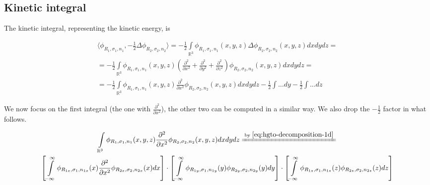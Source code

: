\documentclass{article}
\newcommand{\equalby}[1]{\xlongequal{\text{by }\eqref{#1}}}
\begin{document}
\begin{appendices}
\subsection{Kinetic integral}

The kinetic integral, representing the kinetic energy, is

\begin{equation} \label{eq:hgto-kinetic-1}
\begin{gathered}
\langle \phi_{R_1,\sigma_1,n_1}, -\frac{1}{2}\Delta\phi_{R_2,\sigma_2,n_2} \rangle = -\frac{1}{2} \int\limits_{\mathbb{R}^3} \phi_{R_1,\sigma_1,n_1}(x,y,z) \Delta\phi_{R_2,\sigma_2,n_2}(x,y,z) dxdydz = \\
= -\frac{1}{2} \int\limits_{\mathbb{R}^3} \phi_{R_1,\sigma_1,n_1}(x,y,z) \left(\frac{\partial^2}{\partial x^2}+\frac{\partial^2}{\partial y^2}+\frac{\partial^2}{\partial z^2}\right)\phi_{R_2,\sigma_2,n_2}(x,y,z) dxdydz = \\
= -\frac{1}{2} \int\limits_{\mathbb{R}^3} \phi_{R_1,\sigma_1,n_1}(x,y,z) \frac{\partial^2}{\partial x^2} \phi_{R_2,\sigma_2,n_2}(x,y,z) dxdydz - \frac{1}{2}\int\dots dy - \frac{1}{2}\int\dots dz
\end{gathered}
\end{equation}

We now focus on the first integral (the one with \begin{math}\frac{\partial^2}{\partial x^2}\end{math}), the other two can be computed in a similar way. We also drop the \begin{math}-\frac{1}{2}\end{math} factor in what follows.

\begin{equation} \label{eq:hgto-kinetic-2}
\begin{gathered}
\int\limits_{\mathbb{R}^3} \phi_{R_1,\sigma_1,n_1}(x,y,z) \frac{\partial^2}{\partial x^2} \phi_{R_2,\sigma_2,n_2}(x,y,z) dxdydz \equalby{eq:hgto-decomposition-1d} \\
\left[\int\limits_{-\infty}^\infty \phi_{R_{1x},\sigma_1,n_{1x}}(x)\frac{\partial^2}{\partial x^2}\phi_{R_{2x},\sigma_2,n_{2x}}(x) dx\right] \cdot
\left[\int\limits_{-\infty}^\infty \phi_{R_{1y},\sigma_1,n_{1y}}(y)\phi_{R_{2y},\sigma_2,n_{2y}}(y) dy\right] \cdot
\left[\int\limits_{-\infty}^\infty \phi_{R_{1z},\sigma_1,n_{1z}}(z)\phi_{R_{2z},\sigma_2,n_{2z}}(z) dz\right]
\end{gathered}
\end{equation}


\end{appendices}
\end{document}
